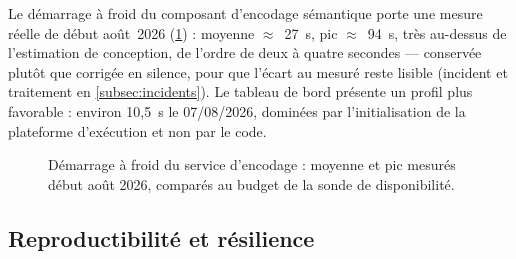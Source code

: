 Le démarrage à froid du composant d'encodage sémantique porte une mesure réelle de début
août~2026 (\cref{graph:coldstart}) : moyenne $\approx$~27~s, pic $\approx$~94~s, très
au-dessus de l'estimation de conception, de l'ordre de deux à quatre secondes --- conservée plutôt
que corrigée en silence, pour que l'écart au mesuré reste lisible (incident et traitement en
\cref{subsec:incidents}). Le tableau de bord présente un profil plus favorable : environ 10,5~s le
07/08/2026, dominées par l'initialisation de la plateforme d'exécution et non par le code.

\begin{figure}[!htbp]
\centering
{}
\caption[Démarrage à froid du service d'encodage]{Démarrage à froid du service d'encodage : moyenne et pic mesurés début août 2026,
comparés au budget de la sonde de disponibilité.}
\label{graph:coldstart}
\end{figure}

\subsection{Reproductibilité et résilience}
\label{sec:resilience}

